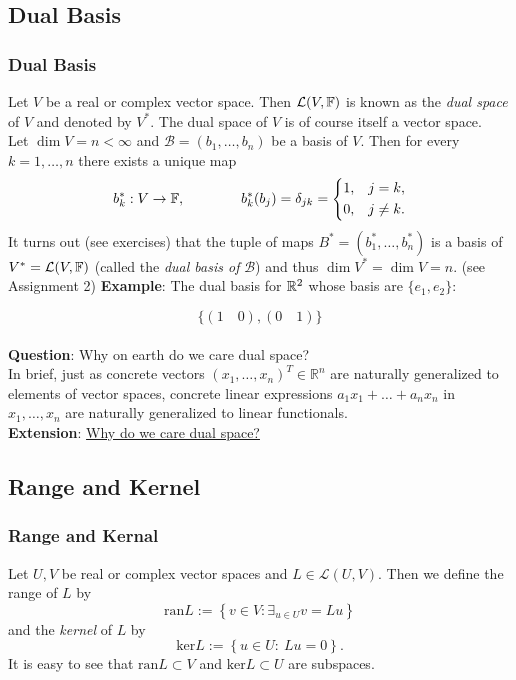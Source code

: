\documentclass[12pt, t]{beamer}
\renewcommand{\emph}[1]{{\color{Turquoise3}\textsl{#1}}}
\newcommand{\nullspace}{~\\[15pt]}
\begin{document}
\subsection{Dual Basis}
\begin{frame}
    \frametitle{Dual Basis}
    Let $V$ be a real or complex vector space. Then $\mathcal{L}(V,\mathbb{F})$ is known as the \emph{dual space} of $V$ and denoted by $V^*$. The dual space of $V$ is of course itself a vector space.\\[9pt]
    Let $\dim V=n<\infty$ and $\mathcal{B}=(b_1,\ldots,b_n)$ be a basis of $V$. Then for every $k=1,\ldots,n$ there exists a unique map
    \[b_k^*:V\to\mathbb{F},\qquad\qquad b_k^*(b_j)=\delta_{jk}=\left\{\begin{aligned}1,\quad &j=k,\\ 0,\quad &j\neq k.\end{aligned}\right.\]
    It turns out (see exercises) that the tuple of maps $B^*=(b_1^*,\ldots,b_n^*)$ is a basis of $V^*=\mathcal{L}(V,\mathbb{F})$ (called the \emph{dual basis of} $\mathcal{B}$) and thus $\dim V^*=\dim V=n$. (see Assignment 2)
    \newpage
    \textbf{Example}:
    The dual basis for $\mathbb{R}^2$ whose basis are $\{e_1,e_2\}$:

    \[\{(1\quad 0),(0\quad 1)\}\]\nullspace

    \textbf{Question}: Why on earth do we care dual space?
    \nullspace
    In brief, just as concrete vectors $\left(x_{1}, \ldots, x_{n}\right)^T \in \mathbb{R}^{n}$ are naturally generalized to elements of vector spaces, concrete linear expressions $a_{1} x_{1}+\ldots+a_{n} x_{n}$ in $x_{1}, \ldots, x_{n}$ are naturally generalized to linear functionals.
    \nullspace
    \textbf{Extension}: \href{https://math.stackexchange.com/questions/3749/why-do-we-care-about-dual-spaces}{Why do we care dual space?}
\end{frame}

\subsection{Range and Kernel}
\begin{frame}
    \frametitle{\textbf{Range and Kernal}}
    Let $U,V$ be real or complex vector spaces and $L\in\mathcal{L}(U,V)$. Then we define the range of $L$ by
    \[\text{ran}L:=\left\{v\in V:\mathop{\exists}_{u\in U}v=Lu\right\}\]
    and the \emph{kernel} of $L$ by
    \[\text{ker}L:=\left\{u\in U:~Lu=0\right\}.\]
    It is easy to see that $\text{ran}L\subset V$ and $\text{ker}L\subset U$ are subspaces.
\end{frame}
\end{document}
